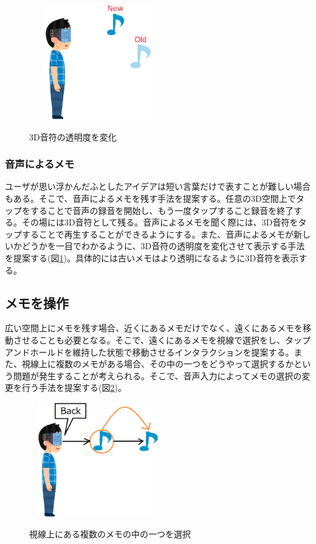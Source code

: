\documentclass{hissymp}
\begin{document}
\begin{figure}[h]
  \begin{center}
    \includegraphics[clip,height=5.0cm,width=6.0cm]{./onpu_memo.eps}
    \caption{3D音符の透明度を変化}
    \label{fig:onpu_memo}
  \end{center}
\end{figure}

\subsubsection{音声によるメモ}
ユーザが思い浮かんだふとしたアイデアは短い言葉だけで表すことが難しい場合もある。そこで、音声によるメモを残す手法を提案する。任意の3D空間上でタップをすることで音声の録音を開始し、もう一度タップすること録音を終了する。その場には3D音符として残る。音声によるメモを聞く際には、3D音符をタップすることで再生することができるようにする。また、音声によるメモが新しいかどうかを一目でわかるように、3D音符の透明度を変化させて表示する手法を提案する(図\ref{fig:onpu_memo})。具体的には古いメモはより透明になるように3D音符を表示する。



\subsection{メモを操作}
広い空間上にメモを残す場合、近くにあるメモだけでなく、遠くにあるメモを移動させることも必要となる。そこで、遠くにあるメモを視線で選択をし、タップアンドホールドを維持した状態で移動させるインタラクションを提案する。また、視線上に複数のメモがある場合、その中の一つをどうやって選択するかという問題が発生することが考えられる。そこで、音声入力によってメモの選択の変更を行う手法を提案する(図\ref{fig:sentaku_memo})。

\begin{figure}[h]
  \begin{center}
    \includegraphics[clip,height=5.0cm,width=6.0cm]{./sentaku_memo.eps}
    \caption{視線上にある複数のメモの中の一つを選択}
    \label{fig:sentaku_memo}
  \end{center}
\end{figure}
\end{document}
